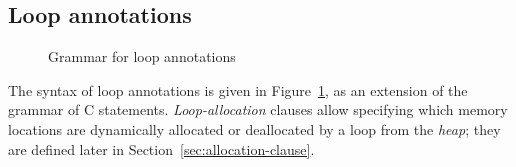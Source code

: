 \subsection{Loop annotations}
\label{sec:loop_annot}

\begin{figure}[t]
  \begin{cadre}
    
  \end{cadre}
  \caption{Grammar for loop annotations}
  \label{fig:gram:loops}
\end{figure}

The syntax of loop annotations is given in Figure~\ref{fig:gram:loops},
as an extension of the grammar of C statements.
\textsl{Loop-allocation} clauses allow specifying which memory locations 
are dynamically allocated or deallocated by a loop from the \textsl{heap}; 
they are defined later in Section~\ref{sec:allocation-clause}.

